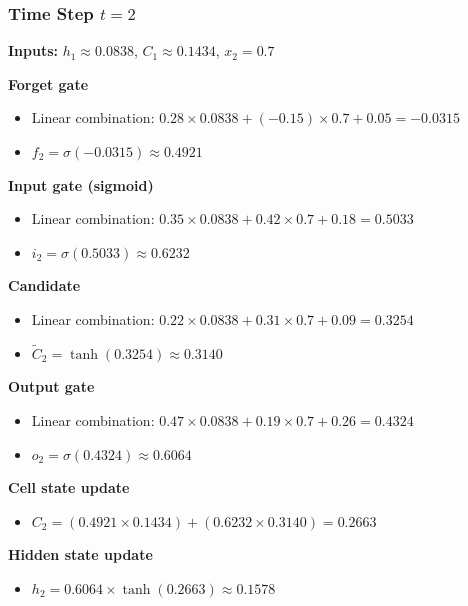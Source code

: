 \documentclass[12pt]{article}
\begin{document}
\subsubsection*{Time Step $t = 2$}

\textbf{Inputs:} $h_1 \approx 0.0838$, $C_1 \approx 0.1434$, $x_2 = 0.7$

\textcolor{headingRed}{\textbf{Forget gate}}
\begin{itemize}[leftmargin=*]
    \item Linear combination: $0.28 \times 0.0838 + (-0.15) \times 0.7 + 0.05 = -0.0315$
    \item $f_2 = \sigma(-0.0315) \approx 0.4921$
\end{itemize}

\textcolor{headingRed}{\textbf{Input gate (sigmoid)}}
\begin{itemize}[leftmargin=*]
    \item Linear combination: $0.35 \times 0.0838 + 0.42 \times 0.7 + 0.18 = 0.5033$
    \item $i_2 = \sigma(0.5033) \approx 0.6232$
\end{itemize}

\textcolor{headingRed}{\textbf{Candidate}}
\begin{itemize}[leftmargin=*]
    \item Linear combination: $0.22 \times 0.0838 + 0.31 \times 0.7 + 0.09 = 0.3254$
    \item $\tilde{C}_2 = \tanh(0.3254) \approx 0.3140$
\end{itemize}

\textcolor{headingRed}{\textbf{Output gate}}
\begin{itemize}[leftmargin=*]
    \item Linear combination: $0.47 \times 0.0838 + 0.19 \times 0.7 + 0.26 = 0.4324$
    \item $o_2 = \sigma(0.4324) \approx 0.6064$
\end{itemize}

\textcolor{headingRed}{\textbf{Cell state update}}
\begin{itemize}[leftmargin=*]
    \item $C_2 = (0.4921 \times 0.1434) + (0.6232 \times 0.3140) = 0.2663$
\end{itemize}

\textcolor{headingRed}{\textbf{Hidden state update}}
\begin{itemize}[leftmargin=*]
    \item $h_2 = 0.6064 \times \tanh(0.2663) \approx 0.1578$
\end{itemize}
\end{document}
